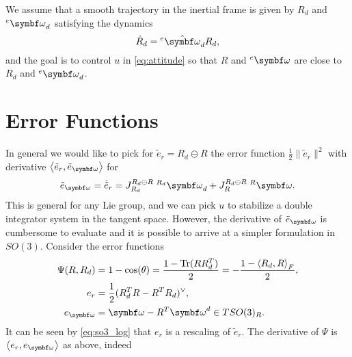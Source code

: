 We assume that a smooth trajectory in the inertial frame is given by $R_d$ and $^e \bomega_d$ satisfying the dynamics
\begin{equation}
  \label{eq:desired_dyn}
  \dot R_d = {^e \hat \bomega_d} R_d,
\end{equation}
and the goal is to control $u$ in \eqref{eq:attitude} so that $R$ and $^e\bomega$ are close to $R_d$ and $^e\bomega_d$.

\section{Error Functions}

In general we would like to pick for $\tilde e_r = R_d \ominus R$ the error function $\frac{1}{2}\| \tilde e_r \|^2$ with derivative $\left\langle \tilde e_r, \tilde e_\bomega \right\rangle$ for
\begin{equation}
  \tilde e_\bomega = {\dot {\tilde e}}_r = {J^{R_d \ominus R}_{R_d}} \; {^{R_d} \bomega_d} + {J^{R_d \ominus R}_{R}} \; {^{R} \bomega}.
\end{equation}
This is general for any Lie group, and we can pick $u$ to stabilize a double integrator system in the tangent space. However, the derivative of $\tilde e_\bomega$ is cumbersome to evaluate and it is possible to arrive at a simpler formulation in $SO(3)$. Consider the error functions
\begin{subequations}
  \begin{align}
    \Psi(R, R_d) & = 1 - \cos(\theta) = \frac{1 - \tr(R R_d^T)}{2} = - \frac{1 - \left\langle R_d, R \right\rangle_F}{2}, \\
    e_r          & = \frac{1}{2} (R_d^T R-R^T R_d)^\vee,                                                                  \\
    e_\bomega    & = \bomega - R^T \bomega^d \in T SO(3)_R.
  \end{align}
\end{subequations}
It can be seen by \eqref{eq:so3_log} that $e_r$ is a rescaling of $\tilde e_r$. The derivative of $\Psi$ is $\left\langle e_r, e_\bomega \right\rangle$ as above, indeed
